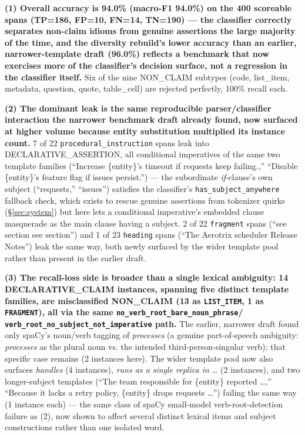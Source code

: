 \textbf{(1) Overall accuracy is 94.0\% (macro-F1 94.0\%) on the 400
scoreable spans (TP=186, FP=10, FN=14, TN=190) --- the classifier
correctly separates non-claim idioms from genuine assertions the large
majority of the time, and the diversity rebuild's lower accuracy than an
earlier, narrower-template draft (96.0\%) reflects a benchmark that now
exercises more of the classifier's decision surface, not a regression in
the classifier itself.} Six of the nine NON\_CLAIM subtypes (code,
list\_item, metadata, question, quote, table\_cell) are rejected
perfectly, 100\% recall each.

\textbf{(2) The dominant leak is the same reproducible parser/classifier
interaction the narrower benchmark draft already found, now surfaced at
higher volume because entity substitution multiplied its instance
count.} 7 of 22 \texttt{procedural\_instruction} spans leak into
DECLARATIVE\_ASSERTION, all conditional imperatives of the same two
template families (``Increase \{entity\}'s timeout if requests keep
failing.,'' ``Disable \{entity\}'s feature flag if issues persist.'')
--- the subordinate \emph{if}-clause's own subject (``requests,''
``issues'') satisfies the classifier's \texttt{has\_subject\_anywhere}
fallback check, which exists to rescue genuine assertions from tokenizer
quirks (\S\ref{sec:system}) but here lets a conditional imperative's
embedded clause masquerade as the main clause having a subject. 2 of 22
\texttt{fragment} spans (``see section see section'') and 1 of 23
\texttt{heading} spans (``The Aerotrix scheduler Release Notes'') leak
the same way, both newly surfaced by the wider template pool rather than
present in the earlier draft.

\textbf{(3) The recall-loss side is broader than a single lexical
ambiguity: 14 DECLARATIVE\_CLAIM instances, spanning five distinct
template families, are misclassified NON\_CLAIM (13 as
\texttt{LIST\_ITEM}, 1 as \texttt{FRAGMENT}), all via the same
\texttt{no\_verb\_root\_bare\_noun\_phrase}/
\texttt{verb\_root\_no\_subject\_not\_imperative} path.} The earlier,
narrower draft found only spaCy's noun/verb tagging of \emph{processes}
(a genuine part-of-speech ambiguity: \emph{processes} as the plural noun
vs. the intended third-person-singular verb); that specific case remains
(2 instances here). The wider template pool now also surfaces
\emph{handles} (4 instances), \emph{runs as a single replica in \ldots}
(2 instances), and two longer-subject templates (``The team responsible
for \{entity\} reported \ldots,'' ``Because it lacks a retry policy,
\{entity\} drops requests \ldots'') failing the same way (1 instance
each) --- the same class of spaCy small-model verb-root-detection
failure as (2), now shown to affect several distinct lexical items and
subject constructions rather than one isolated word.

